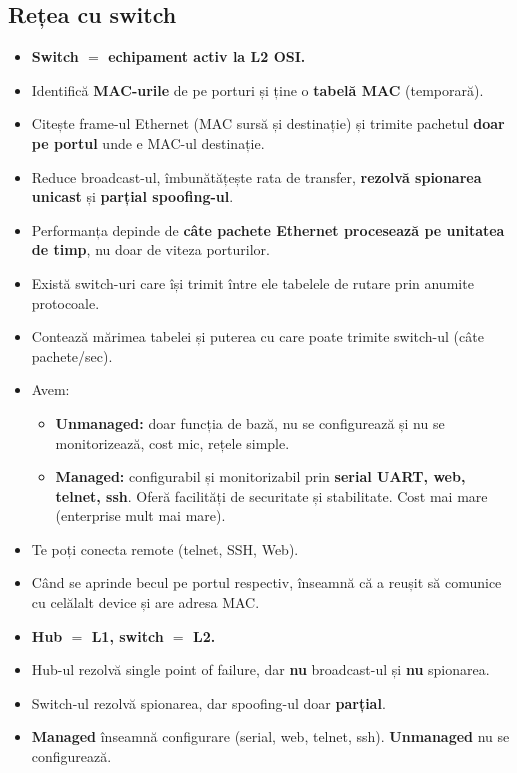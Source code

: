 \documentclass[11pt,a4paper]{article}
\begin{document}
\subsection*{Rețea cu switch}
\begin{itemize}
  \item \textbf{Switch $=$ echipament activ la L2 OSI.}
  \item Identifică \textbf{MAC-urile} de pe porturi și ține o \textbf{tabelă MAC} (temporară).
  \item Citește frame-ul Ethernet (MAC sursă și destinație) și trimite pachetul \textbf{doar pe portul} unde e MAC-ul destinație.
  \item Reduce broadcast-ul, îmbunătățește rata de transfer, \textbf{rezolvă spionarea unicast} și \textbf{parțial spoofing-ul}.
  \item Performanța depinde de \textbf{câte pachete Ethernet procesează pe unitatea de timp}, nu doar de viteza porturilor.
  \item Există switch-uri care își trimit între ele tabelele de rutare prin anumite protocoale.
  \item Contează mărimea tabelei și puterea cu care poate trimite switch-ul (câte pachete/sec).
  \item Avem:
  \begin{itemize}
    \item \textbf{Unmanaged:} doar funcția de bază, nu se configurează și nu se monitorizează, cost mic, rețele simple.
    \item \textbf{Managed:} configurabil și monitorizabil prin \textbf{serial UART, web, telnet, ssh}. Oferă facilități de securitate și stabilitate. Cost mai mare (enterprise mult mai mare).
  \end{itemize}
  \item Te poți conecta remote (telnet, SSH, Web).
  \item Când se aprinde becul pe portul respectiv, înseamnă că a reușit să comunice cu celălalt device și are adresa MAC.
\end{itemize}

\begin{capcana}
\begin{itemize}
  \item \textbf{Hub $=$ L1, switch $=$ L2.}
  \item Hub-ul rezolvă single point of failure, dar \textbf{nu} broadcast-ul și \textbf{nu} spionarea.
  \item Switch-ul rezolvă spionarea, dar spoofing-ul doar \textbf{parțial}.
  \item \textbf{Managed} înseamnă configurare (serial, web, telnet, ssh). \textbf{Unmanaged} nu se configurează.
\end{itemize}
\end{capcana}
\end{document}
